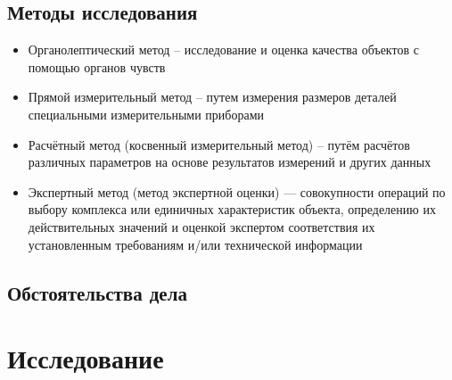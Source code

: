 \subsection{Методы исследования}
\begin{itemize}
\item  Органолептический метод – исследование и оценка качества объектов с помощью органов чувств
\item 	Прямой измерительный метод – путем измерения размеров деталей специальными измерительными приборами
\item Расчётный метод (косвенный измерительный метод) – путём расчётов различных параметров на основе результатов измерений и других данных
\item Экспертный метод (метод экспертной оценки) — совокупности операций по выбору комплекса или единичных характеристик объекта, определению их действительных значений и оценкой экспертом соответствия их установленным требованиям и/или технической информации
\end{itemize}


%
%	

\subsection{Обстоятельства дела}
%
 
%
%
\section{Исследование}
%

